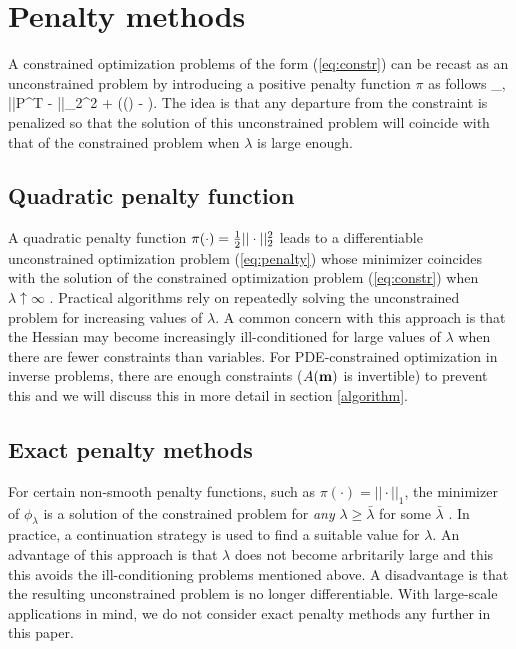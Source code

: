 \documentclass{iopart}
\begin{document}
\section{Penalty methods}
\label{penalty}
A constrained optimization problems of the form (\ref{eq:constr})
can be recast as an unconstrained problem by introducing a positive penalty function $\pi$ as follows
\bq
\label{eq:penalty}
\min_{,} ||P^T - ||_2^2 + \lambda\pi(() - ).
\eq
The idea is that any departure from the constraint is penalized so that the solution of this 
unconstrained problem will coincide with that of the constrained problem when $\lambda$ is large enough.

\subsection{Quadratic penalty function}
A quadratic penalty function $\pi(\cdot) = {\textstyle\frac{1}{2}}||\cdot||_2^2$ leads to a differentiable 
unconstrained optimization problem (\ref{eq:penalty}) whose minimizer coincides with the solution
of the constrained optimization problem (\ref{eq:constr}) when $\lambda \uparrow \infty$ \cite[Thm. 17.1]{Nocedal}. 
Practical algorithms rely on repeatedly solving the unconstrained problem for increasing values of $\lambda$.
A common concern with this approach is that the Hessian may become increasingly ill-conditioned 
for large values of $\lambda$ when there are fewer constraints than variables. For PDE-constrained 
optimization in inverse problems, there are enough constraints ($A(\mathbf{m})$ is invertible) to prevent this and we will
discuss this in more detail in section \ref{algorithm}.

\subsection{Exact penalty methods}
For certain non-smooth penalty functions, such as $\pi(\cdot) = ||\cdot||_1$, the minimizer of $\phi_{\lambda}$
is a solution of the constrained problem for \emph{any} $\lambda \geq \bar{\lambda}$ for some $\bar{\lambda}$
\cite[Thm. 17.3]{Nocedal}. In practice, a continuation
strategy is used to find a suitable value for $\lambda$. An advantage of this approach is that $\lambda$ does
not become arbritarily large and this this avoids the ill-conditioning problems mentioned above. A disadvantage
is that the resulting unconstrained problem is no longer differentiable. 
With large-scale applications in mind, we do not consider exact penalty methods any further in this paper.
\end{document}
